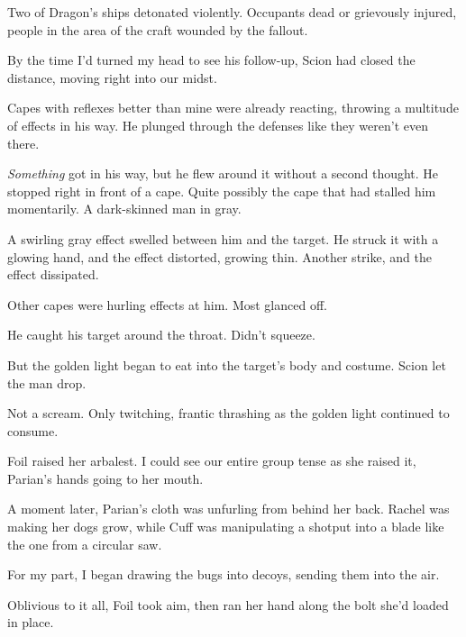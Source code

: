 Two of Dragon's ships detonated violently.  Occupants dead or grievously injured, people in the area of the craft wounded by the fallout.



By the time I'd turned my head to see his follow-up, Scion had closed the distance, moving right into our midst.



Capes with reflexes better than mine were already reacting, throwing a multitude of effects in his way.  He plunged through the defenses like they weren't even there.



\emph{Something} got in his way, but he flew around it without a second thought.  He stopped right in front of a cape.  Quite possibly the cape that had stalled him momentarily.  A dark-skinned man in gray.



A swirling gray effect swelled between him and the target.  He struck it with a glowing hand, and the effect distorted, growing thin.  Another strike, and the effect dissipated.



Other capes were hurling effects at him.  Most glanced off.



He caught his target around the throat.  Didn't squeeze.



But the golden light began to eat into the target's body and costume.  Scion let the man drop.



Not a scream.  Only twitching, frantic thrashing as the golden light continued to consume.



Foil raised her arbalest.  I could see our entire group tense as she raised it, Parian's hands going to her mouth.



A moment later, Parian's cloth was unfurling from behind her back.  Rachel was making her dogs grow, while Cuff was manipulating a shotput into a blade like the one from a circular saw.



For my part, I began drawing the bugs into decoys, sending them into the air.



Oblivious to it all, Foil took aim, then ran her hand along the bolt she'd loaded in place.



